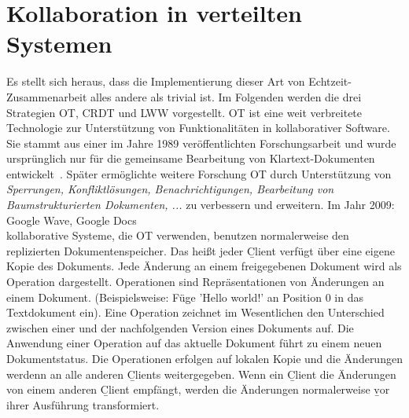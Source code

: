 \section{Kollaboration in verteilten Systemen}
Es stellt sich heraus, dass die Implementierung dieser Art von Echtzeit-Zusammenarbeit alles andere als trivial ist.
Im Folgenden werden die drei Strategien \gls{OT}, \gls{CRDT} und \gls{LWW} vorgestellt.
%
%
\gls{OT} ist eine weit verbreitete Technologie zur Unterstützung von Funktionalitäten in \gls{kollaborativ}er Software. Sie stammt aus einer im Jahre 1989 veröffentlichten Forschungsarbeit und wurde ursprünglich nur für die gemeinsame Bearbeitung von Klartext-Dokumenten entwickelt~\cite{ot_paper}. Später ermöglichte weitere Forschung \gls{OT} durch Unterstützung von \textit{Sperrungen, Konfliktlösungen, Benachrichtigungen, Bearbeitung von Baumstrukturierten Dokumenten, ...} zu verbessern und erweitern. Im Jahr 2009: Google Wave, Google Docs\\
\Gls{kollaborativ}e Systeme, die \gls{OT} verwenden, benutzen normalerweise den replizierten Dokumentenspeicher. Das heißt jeder \b{Client} verfügt über eine eigene Kopie des Dokuments.
Jede Änderung an einem freigegebenen Dokument wird als Operation dargestellt. Operationen sind Repräsentationen von Änderungen an einem Dokument. (Beispielsweise: Füge 'Hello world!' an Position 0 in das Textdokument ein).  Eine Operation zeichnet im Wesentlichen den Unterschied zwischen einer und der nachfolgenden Version eines Dokuments auf. Die Anwendung einer Operation auf das aktuelle Dokument führt zu einem neuen Dokumentstatus.
Die Operationen erfolgen auf lokalen Kopie und die Änderungen werdenn an alle anderen \b{Clients} weitergegeben.  Wenn ein \b{Client} die Änderungen von einem anderen \b{Client} empfängt, werden die Änderungen normalerweise \b{vor} ihrer Ausführung transformiert.
\\

